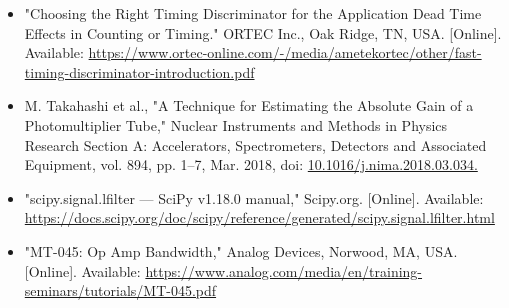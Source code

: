 \documentclass[10pt]{article}
\begin{document}
\begin{itemize}
\item [8]"Choosing the Right Timing Discriminator for the Application Dead Time Effects in Counting or Timing." ORTEC Inc., Oak Ridge, TN, USA. [Online]. Available: \url{ https://www.ortec-online.com/-/media/ametekortec/other/fast-timing-discriminator-introduction.pdf}


\item [9]M. Takahashi et al., "A Technique for Estimating the Absolute Gain of a Photomultiplier Tube," Nuclear Instruments and Methods in Physics Research Section A: Accelerators, Spectrometers, Detectors and Associated Equipment, vol. 894, pp. 1–7, Mar. 2018, doi: \url{10.1016/j.nima.2018.03.034.}

\item [10]"scipy.signal.lfilter — SciPy v1.18.0 manual," Scipy.org. [Online]. Available: \url{https://docs.scipy.org/doc/scipy/reference/generated/scipy.signal.lfilter.html} 

\item [11]"MT-045: Op Amp Bandwidth," Analog Devices, Norwood, MA, USA. [Online]. Available: \url{https://www.analog.com/media/en/training-seminars/tutorials/MT-045.pdf}
\end{itemize}
\end{document}
